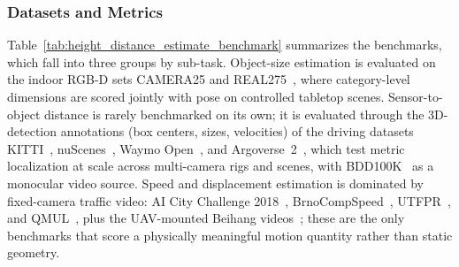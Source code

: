 \subsubsection{Datasets and Metrics}
Table~\ref{tab:height_distance_estimate_benchmark} summarizes the benchmarks, which fall into three groups by sub-task. Object-size estimation is evaluated on the indoor RGB-D sets CAMERA25 and REAL275~\cite{Wang0HVSG19}, where category-level dimensions are scored jointly with pose on controlled tabletop scenes. Sensor-to-object distance is rarely benchmarked on its own; it is evaluated through the 3D-detection annotations (box centers, sizes, velocities) of the driving datasets KITTI~\cite{Geiger2013KITTI}, nuScenes~\cite{caesar2020nuscenes}, Waymo Open~\cite{WaymoOpen-SunKDCPTGZCCVHN20}, and Argoverse~2~\cite{wilson2023argoverse}, which test metric localization at scale across multi-camera rigs and scenes, with BDD100K~\cite{yu2020bdd100k} as a monocular video source. Speed and displacement estimation is dominated by fixed-camera traffic video: AI City Challenge 2018~\cite{Naphade_2018_CVPR_Workshops}, BrnoCompSpeed~\cite{SochorJSMSHZ17}, UTFPR~\cite{LuvizonNM17}, and QMUL~\cite{moazzam2019image}, plus the UAV-mounted Beihang videos~\cite{KeKLW15}; these are the only benchmarks that score a physically meaningful motion quantity rather than static geometry.

